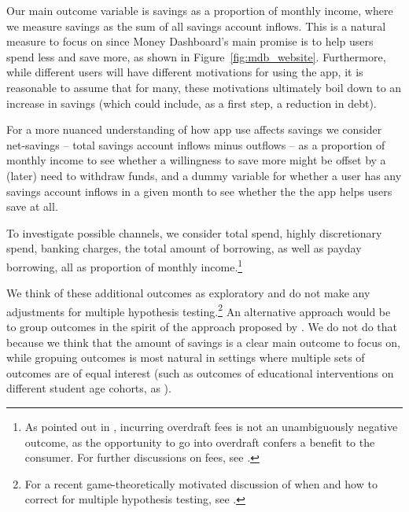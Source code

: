 \documentclass[a4paper, 11pt]{article}
\begin{document}
Our main outcome variable is savings as a proportion of monthly income, where
we measure savings as the sum of all savings account inflows. This is a natural
measure to focus on since Money Dashboard's main promise is to help users spend
less and save more, as shown in Figure~\ref{fig:mdb_website}.  Furthermore,
while different users will have different motivations for using the app, it is
reasonable to assume that for many, these motivations ultimately boil down to
an increase in savings (which could include, as a first step, a reduction in
debt).

For a more nuanced understanding of how app use affects savings we consider
net-savings -- total savings account inflows minus outflows -- as a proportion
of monthly income to see whether a willingness to save more might be offset by
a (later) need to withdraw funds, and a dummy variable for whether a user has
any savings account inflows in a given month to see whether the the app helps
users save at all.

To investigate possible channels, we consider total spend, highly discretionary
spend, banking charges, the total amount of borrowing, as well as payday
borrowing, all as proportion of monthly income.\footnote{As pointed out in
    \citet{carlin2017fintech}, incurring overdraft fees is not an unambiguously
negative outcome, as the opportunity to go into overdraft confers a benefit to
the consumer. For further discussions on fees, see \citet{jorring2019financial,
stango2009consumers}.}

We think of these additional outcomes as exploratory and do not make any
adjustments for multiple hypothesis testing.\footnote{For a recent
game-theoretically motivated discussion of when and how to correct for multiple
hypothesis testing, see \citet{viviano2021should}.} An alternative approach
would be to group outcomes in the spirit of the approach proposed by
\citet{anderson2008multiple}. We do not do that because we think that the
amount of savings is a clear main outcome to focus on, while gropuing outcomes
is most natural in settings where multiple sets of outcomes are of equal
interest (such as outcomes of educational interventions on different student
age cohorts, as \citet{anderson2008multiple}).
\end{document}
